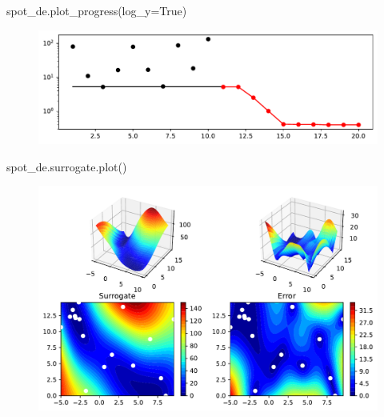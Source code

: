 \documentclass[
  letterpaper,
  DIV=11,
  numbers=noendperiod]{scrreprt}
\newenvironment{Shaded}{\begin{snugshade}}{\end{snugshade}}
\newcommand{\NormalTok}[1]{\textcolor[rgb]{0.00,0.23,0.31}{#1}}
\newcommand{\OperatorTok}[1]{\textcolor[rgb]{0.37,0.37,0.37}{#1}}
\newcommand{\VariableTok}[1]{\textcolor[rgb]{0.07,0.07,0.07}{#1}}
\begin{document}
\begin{Shaded}
\begin{Highlighting}[]
\NormalTok{spot\_de.plot\_progress(log\_y}\OperatorTok{=}\VariableTok{True}\NormalTok{)}
\end{Highlighting}
\end{Shaded}

\begin{figure}[H]

{\centering \includegraphics{004_spot_sklearn_optimization_files/figure-pdf/cell-8-output-1.pdf}

}

\end{figure}

\begin{Shaded}
\begin{Highlighting}[]
\NormalTok{spot\_de.surrogate.plot()}
\end{Highlighting}
\end{Shaded}

\begin{figure}[H]

{\centering \includegraphics{004_spot_sklearn_optimization_files/figure-pdf/cell-9-output-1.pdf}

}

\end{figure}
\end{document}
